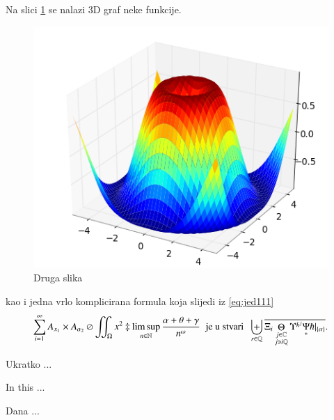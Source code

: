 \documentclass[a4paper,twoside,12pt]{memoir} %
\begin{document}
Na slici \ref{fig:3d} se nalazi 3D graf neke funkcije. 

\begin{figure}[h!t]
\centering \includegraphics{surface3d.png}
\caption{Druga slika}
\label{fig:3d}
\end{figure}

kao i jedna vrlo komplicirana formula koja slijedi iz \eqref{eq:jed111}
\[ \sum_{i=1}^{\infty}A_{x_1}\times A_{{\alpha}_2}\oslash\iint_{\Omega}x^2\ddagger\limsup_{n\in\mathbb{N}}\frac{\alpha+\theta+\gamma}{n^{\omega}}\;\;\text{je u stvari}\;\;\biguplus_{r\in\mathbb{Q}}\overline{\Xi_i \mathop\Theta_{\substack{j\in\mathbb{C} \\ j\ni i\mathbb{Q}}} \Upsilon^{k^j} \underset{\ast}{\Psi} \hslash\vert_{\{\alpha\}}}.\]




\pagestyle{empty} %


\begin{sazetak}
Ukratko ...
\end{sazetak}

\begin{summary}
In this ...
\end{summary}


\begin{cv}
Dana ...
\end{cv}
\end{document}
